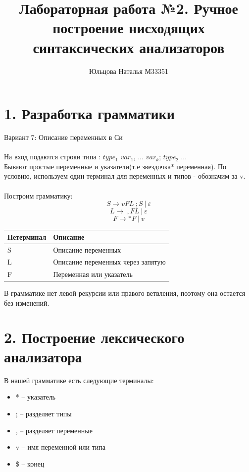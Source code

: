 \documentclass[10pt,a4paper,oneside]{article}
\title{Лабораторная работа №2.  Ручное построение
нисходящих синтаксических анализаторов }
\author{Юльцова Наталья М33351}
\begin{document}
  \maketitle
  
  \section{1. Разработка грамматики}
  \noindent 
  Вариант 7: Описание переменных в Си\\\\
  На вход подаются строки типа : $type_1$ $var_1$, ... $var_k$; $type_2$  ... \\
  Бывают простые переменные и указатели(т.е звездочка* переменная). По условию, используем один терминал для переменных и типов - обозначим за v.\\\\
  
  Построим грамматику:\\
  
  $$S \rightarrow vFL \ ;S \ | \ \varepsilon$$
  $$L \rightarrow \ ,FL\ | \ \varepsilon$$
  $$F \rightarrow  *F \ | \ v$$ 
  
  \begin{center}
      \begin{tabular}{ | l | l | }
      \hline
      Нетерминал & Описание \\ \hline
      S & Описание переменных \\ \hline
      L & Описание переменных через запятую \\ \hline
      F & Переменная или указатель \\ \hline
      \end{tabular}
  \end{center}
  
   В грамматике нет левой рекурсии или правого ветвления, поэтому она остается без изменений.
  
  \section{2. Построение лексического анализатора}
  \noindent
  В нашей грамматике есть следующие терминалы:
  \begin{itemize}
      \item * -- указатель
      \item ; -- разделяет типы
      \item , -- разделяет переменные
      \item v -- имя переменной или типа
      \item \$ -- конец
  \end{itemize}
  
\end{document}
